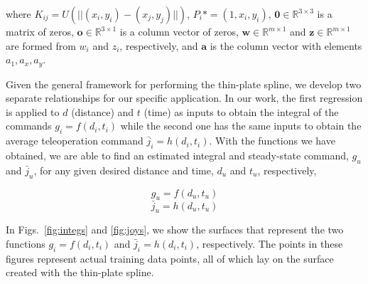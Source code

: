 \documentclass[letterpaper, 10 pt, conference]{ieeeconf}  %
\newcommand\NB[1]{$\spadesuit$\footnote{NB: #1}}
\begin{document}
where $K_{ij} = U(||(x_i,y_i)-(x_j,y_j)||)$, $P_i* = (1,x_i,y_i)$, $\bm{0}  \in \mathbb{R}^{3\times3}$ is a matrix of zeros, $\bm{o} \in \mathbb{R}^{3\times1}$ is a column vector of zeros, $\bm{w} \in \mathbb{R}^{m\times1}$ and $\bm{z} \in \mathbb{R}^{m\times1}$ are formed from $w_i$ and $z_i$, respectively, and $\bm{a}$ is the column vector with elements $a_1,a_x,a_y$.

Given the general framework for performing the thin-plate spline, we develop two separate relationships for our specific application. In our work, the first regression is applied to $d$ (distance) and $t$ (time) as inputs to obtain the integral of the commands $g_i = f(d_i,t_i)$ while the second one has the same inputs to obtain the average teleoperation command $\bar{j}_i = h(d_i,t_i)$. With the functions we have obtained, we are able to find an estimated integral and steady-state command, $g_u$ and $\bar{j}_u$, for any given desired distance and time, $d_u$ and $t_u$, respectively,

\begin{equation} \label{eq:integralfit}
g_u = f(d_u,t_u)
\end{equation}
\begin{equation} \label{eq:ssvelfit}
\bar{j}_u = h(d_u,t_u)
\end{equation}

In Figs.~\ref{fig:integs} and \ref{fig:joys}, we show the surfaces that represent the two functions $g_i = f(d_i,t_i)$ and $\bar{j}_i = h(d_i,t_i)$, respectively. The points in these figures represent actual training data points, all of which lay on the surface created with the thin-plate spline.
\end{document}
